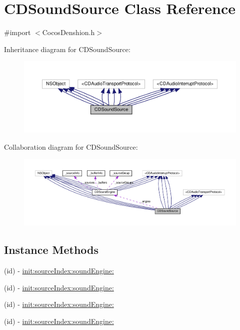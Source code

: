 \hypertarget{interfaceCDSoundSource}{}\section{C\+D\+Sound\+Source Class Reference}
\label{interfaceCDSoundSource}


{\ttfamily \#import $<$Cocos\+Denshion.\+h$>$}



Inheritance diagram for C\+D\+Sound\+Source\+:
\nopagebreak
\begin{figure}[H]
\begin{center}
\leavevmode
\includegraphics[width=350pt]{interfaceCDSoundSource__inherit__graph}
\end{center}
\end{figure}


Collaboration diagram for C\+D\+Sound\+Source\+:
\nopagebreak
\begin{figure}[H]
\begin{center}
\leavevmode
\includegraphics[width=350pt]{interfaceCDSoundSource__coll__graph}
\end{center}
\end{figure}
\subsection*{Instance Methods}
\begin{DoxyCompactItemize}
\item 
(id) -\/ \hyperlink{interfaceCDSoundSource_a1238cf4aee74d345437dba31efce78ab}{init\+:source\+Index\+:sound\+Engine\+:}
\item 
(id) -\/ \hyperlink{interfaceCDSoundSource_a1238cf4aee74d345437dba31efce78ab}{init\+:source\+Index\+:sound\+Engine\+:}
\item 
(id) -\/ \hyperlink{interfaceCDSoundSource_a1238cf4aee74d345437dba31efce78ab}{init\+:source\+Index\+:sound\+Engine\+:}
\item 
(id) -\/ \hyperlink{interfaceCDSoundSource_a1238cf4aee74d345437dba31efce78ab}{init\+:source\+Index\+:sound\+Engine\+:}
\end{DoxyCompactItemize}
